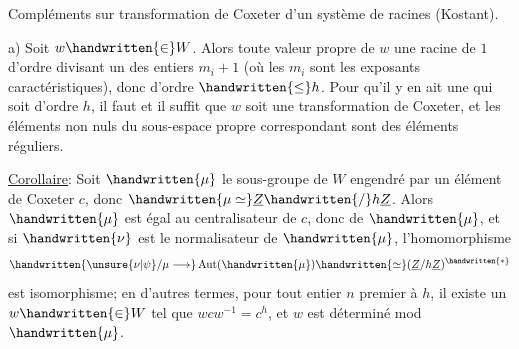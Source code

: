 Compléments sur transformation de Coxeter d'un système de racines (Kostant).

a) Soit $w\handwritten{\in}W$. Alors toute valeur propre de $w$  une racine de $1$ d'ordre divisant un des entiers $m_i+1$ (où les $m_i$ sont les exposants caractéristiques), donc d'ordre $\handwritten{\leq}h$. Pour qu'il y en ait une qui soit d'ordre $h$, il faut et il suffit que $w$ soit une transformation de Coxeter, et les éléments non nuls du sous-espace propre correspondant sont des éléments réguliers.

\uline{Corollaire}: Soit $\handwritten{\mu}$ le sous-groupe de $W$ engendré par un élément de Coxeter $c$, donc $\handwritten{\mu\simeq}\underline{Z}\handwritten{/}h\underline{Z}$. Alors $\handwritten{\mu}$ est égal au centralisateur de $c$, donc de $\handwritten{\mu}$, et si $\handwritten{\nu}$ est le normalisateur de $\handwritten{\mu}$, l'homomorphisme
\[
\handwritten{\unsure{\nu|\psi}/\mu\longrightarrow}\operatorname{Aut}(\handwritten{\mu})\handwritten{\simeq}(\underline{Z}/h\underline{Z})^{\handwritten{*}}
\]
est  isomorphisme; en d'autres termes, pour tout entier $n$ premier à $h$, il existe un $w\handwritten{\in}W$ tel que $wcw^{-1}=c^h$, et $w$ est déterminé mod $\handwritten{\mu}$.


